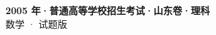 \documentclass[zihao=-4, a4paper]{ctexart}
\begin{document}
\begin{center}
  {\Large\bfseries 2005 年·普通高等学校招生考试·山东卷·理科}\\[4pt]
  {\large 数学 · 试题版}
\end{center}
\medskip
{}

\end{document}
